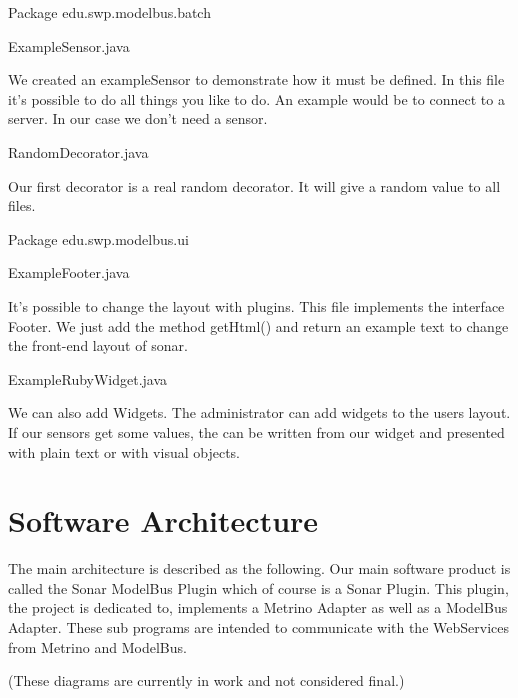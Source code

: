 Package edu.swp.modelbus.batch

ExampleSensor.java

We created an exampleSensor to demonstrate how it must be defined. In this file it's possible to do all things you like to do. An example would be to connect to a server. In our case we don't need a sensor.

RandomDecorator.java

Our first decorator is a real random decorator. It will give a random value to all files.

Package edu.swp.modelbus.ui

ExampleFooter.java

It's possible to change the layout with plugins. This file implements the interface Footer. We just add the method getHtml() and return an example text to change the front-end layout of sonar.

ExampleRubyWidget.java

We can also add Widgets. The administrator can add widgets to the users layout. If our sensors get some values, the can be written from our widget and presented with plain text or with visual objects.

\section{Software Architecture}
The main architecture is described as the following. Our main software product is called the Sonar ModelBus Plugin which of course is a Sonar Plugin. This plugin, the project is dedicated to, implements a Metrino Adapter as well as a ModelBus Adapter. These sub programs are intended to communicate with the WebServices from Metrino and ModelBus.

(These diagrams are currently in work and not considered final.)

